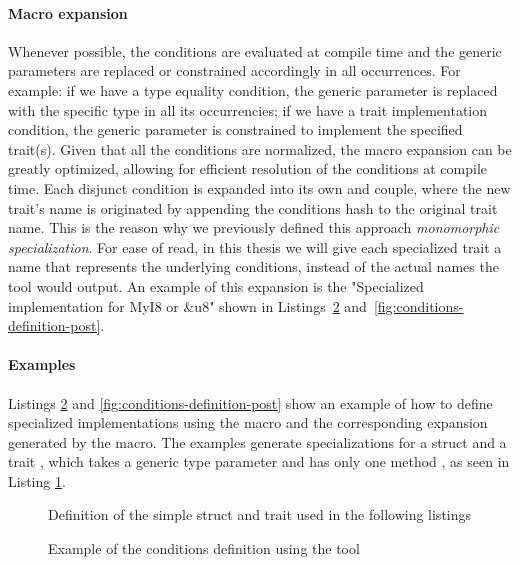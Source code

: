 \paragraph{Macro expansion}
Whenever possible, the conditions are evaluated at compile time and the generic parameters are replaced or constrained accordingly in all occurrences.
For example: if we have a type equality condition, the generic parameter is replaced with the specific type in all its occurrencies; if we have a trait implementation condition, the generic parameter is constrained to implement the specified trait(s).
Given that all the conditions are normalized, the macro expansion can be greatly optimized, allowing for efficient resolution of the conditions at compile time.
Each disjunct condition is expanded into its own  and  couple, where the new trait's name is originated by appending the conditions hash to the original trait name.
This is the reason why we previously defined this approach \textit{monomorphic specialization}.
For ease of read, in this thesis we will give each specialized trait a name that represents the underlying conditions, instead of the actual names the tool would output.
An example of this expansion is the "Specialized implementation for MyI8 or \&u8" shown in Listings~\ref{fig:conditions-definition-pre} and~\ref{fig:conditions-definition-post}.

\paragraph{Examples}
Listings \ref{fig:conditions-definition-pre} and \ref{fig:conditions-definition-post} show an example of how to define specialized implementations using the  macro and the corresponding expansion generated by the macro.
The examples generate specializations for a struct  and a trait , which takes a generic type parameter  and has only one method , as seen in Listing \ref{fig:conditions-definition-common}.

\begin{figure}[htbp!]
	\centering
	\captionsetup{type=listing,skip=2pt}
	\caption{Definition of the simple struct and trait used in the following listings}
	\label{fig:conditions-definition-common}
\end{figure}

\begin{figure}[htbp!]
	\centering
	\captionsetup{type=listing,skip=2pt}
	\caption{Example of the conditions definition using the tool}
	\label{fig:conditions-definition-pre}
\end{figure}

